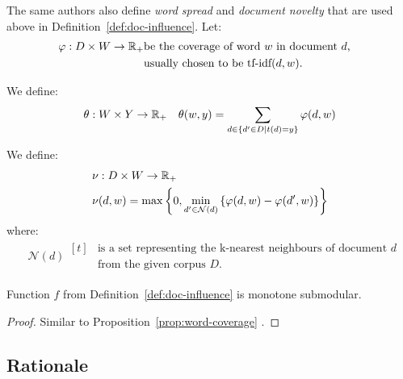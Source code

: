 The same authors \cite{sipos2012temporal} also define \emph{word spread} and
\emph{document novelty} that are used above in
Definition~\ref{def:doc-influence}.
Let:
\begin{align*}
  &\varphi : D \times W \to \mathbb{R}_+
  \begin{aligned}[t]
    &\text{be the coverage of word \(w\) in document \(d\),} \\
    &\text{usually chosen to be tf-idf\((d, w)\).}
  \end{aligned}
\end{align*}

\begin{definition}
  \label{def:word-spread}
  We define:
  \begin{align*}
    &\theta : W \times Y \to \mathbb{R}_+
    &\theta(w, y) = \sum_{d \in \{d' \in D | t(d) = y\}} \varphi(d, w)
  \end{align*}
\end{definition}

\begin{definition}
  \label{def:doc-novelty}
  We define:
  \begin{align*}
    &\nu : D \times W \to \mathbb{R}_+ \\
    &\nu(d, w) = \max \left\{ 0, \min_{d' \in \mathcal{N}(d)}
      \left\{ \varphi(d, w) - \varphi(d', w) \right\} \right\}
  \end{align*}
  where:
  \begin{align*}
    &\mathcal{N}(d)
    \begin{aligned}[t]
      &\text{is a set representing the k-nearest neighbours of
    document \(d\)} \\
      &\text{from the given corpus \(D\).}
    \end{aligned}
  \end{align*}
\end{definition}

\begin{proposition}
  Function \(f\) from Definition~\ref{def:doc-influence} is monotone submodular.
  \begin{proof}
    Similar to Proposition~\ref{prop:word-coverage} \cite{sipos2012temporal}.
  \end{proof}
\end{proposition}
\subsection{Rationale}


